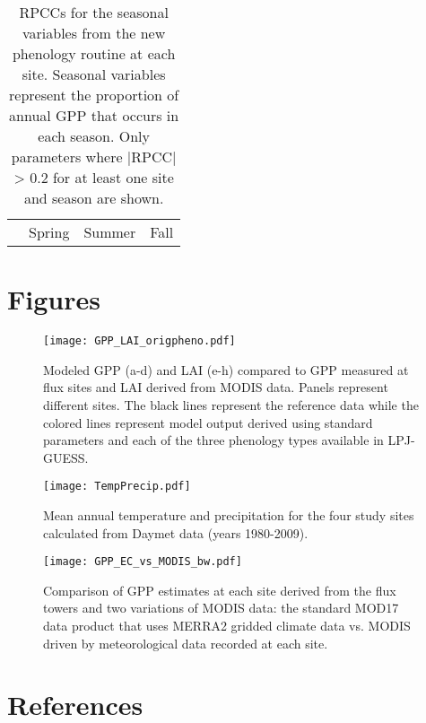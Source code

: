\documentclass[]{article}
\begin{document}
\begin{table}[ht]
	\begin{threeparttable}
		\caption{RPCCs for the seasonal variables from the new phenology routine at each site. Seasonal variables represent the proportion of annual GPP that occurs in each season. Only parameters where |RPCC| > 0.2 for at least one site and season are shown.} 
		\begin{tabularx}{\textwidth}{lrrrrrrrrrrrr}
			\toprule
			& \multicolumn{4}{c}{Spring} & \multicolumn{4}{c}{Summer} & \multicolumn{4}{c}{Fall} \\
			\cmidrule(lr){2-5} \cmidrule(lr){6-9} \cmidrule(lr){10-13}
			
		\end{tabularx}
	\end{threeparttable}
\end{table}

\section{Figures}
\begin{figure}[!htbp]
\begin{measuredfigure}
	\texttt{[image: GPP\_LAI\_origpheno.pdf]}
	\caption{Modeled GPP (a-d) and LAI (e-h) compared to GPP measured at flux sites and LAI derived from MODIS data. Panels represent different sites. The black lines represent the reference data while the colored lines represent model output derived using standard parameters and each of the three phenology types available in LPJ-GUESS.}
	\label{fig:origpheno}
	\end{measuredfigure}
\end{figure}

\begin{figure}[!htbp]
	\begin{measuredfigure}
		\texttt{[image: TempPrecip.pdf]}
		\caption{Mean annual temperature and precipitation for the four study sites calculated from Daymet data (years 1980-2009).}
		\label{fig:origpheno}
	\end{measuredfigure}
\end{figure}

\begin{figure}[!htbp]
	\begin{measuredfigure}
		\texttt{[image: GPP\_EC\_vs\_MODIS\_bw.pdf]}
		\caption{Comparison of GPP estimates at each site derived from the flux towers and two variations of MODIS data: the standard MOD17 data product that uses MERRA2 gridded climate data vs. MODIS driven by meteorological data recorded at each site.}
		\label{fig:origpheno}
	\end{measuredfigure}
\end{figure}

\section{References}


\end{document}
